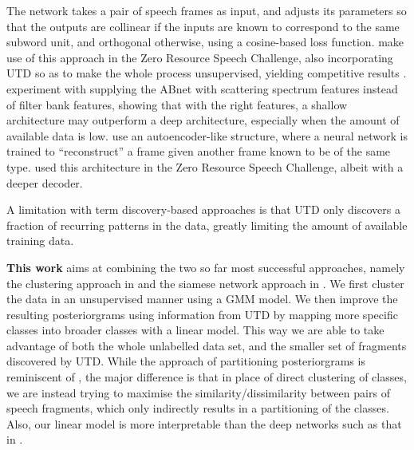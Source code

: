 The network takes a pair of speech frames as input, and adjusts its parameters so that the outputs are collinear if the inputs are known to correspond to the same subword unit, and orthogonal otherwise, using a cosine-based loss function.
\textcite{thiolliere2015hybrid} make use of this approach in the Zero Resource Speech Challenge, also incorporating UTD so as to make the whole process unsupervised, yielding competitive results \parencite{versteegh2016zero}.
\textcite{zeghidour2016deep} experiment with supplying the ABnet with scattering spectrum features instead of filter bank features, showing that with the right features, a shallow architecture may outperform a deep architecture, especially when the amount of available data is low.
\textcite{kamper2015unsupervised} use an autoencoder-like structure, where a neural network is trained to ``reconstruct'' a frame given another frame known to be of the same type.
\textcite{renshaw2015comparison} used this architecture in the Zero Resource Speech Challenge, albeit with a deeper decoder.

A limitation with term discovery-based approaches is that UTD only discovers a fraction of recurring patterns in the data, greatly limiting the amount of available training data.

\textbf{This work} %
aims at combining the two so far most successful approaches, namely the clustering approach in \parencite{chen2015parallel} and the siamese network approach in \parencite{thiolliere2015hybrid}.
We first cluster the data in an unsupervised manner using a GMM model.
We then improve the resulting posteriorgrams using information from UTD by mapping more specific classes into broader classes with a linear model.
This way we are able to take advantage of both the whole unlabelled data set, and the smaller set of fragments discovered by UTD.
While the approach of partitioning posteriorgrams is reminiscent of \parencite{jansen2013weak}, the major difference is that in place of direct clustering of classes, we are instead trying to maximise the similarity/dissimilarity between pairs of speech fragments, which only indirectly results in a partitioning of the classes.
Also, our linear model is more interpretable than the deep networks such as that in \parencite{thiolliere2015hybrid}.

